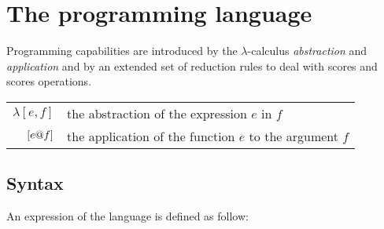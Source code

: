 \documentclass[10pt,a4paper,frenchb]{article}
\begin{document}
\section{The programming language}

Programming capabilities are introduced by the $\lambda$-calculus \emph{abstraction} and \emph{application} and by an extended set of reduction rules to deal with scores and scores operations.

\begin{center}
\begin{tabular}{rl}
\hline
$\lambda [e,f]$ & the abstraction of the expression $e$ in $f$ \\
$[e @ f]$ & the application of the function $e$ to the argument $f$\\
\hline
\end{tabular}
\end{center}

\subsection{Syntax}

An expression of the language is defined as follow:
\end{document}
